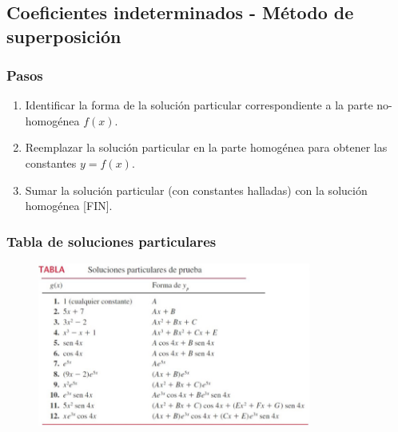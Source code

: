 \chapter{}
\section{Coeficientes indeterminados - Método de superposición}

\subsection{Pasos}

\begin{enumerate}
\item Identificar la forma de la solución particular correspondiente a la parte no-homogénea $f(x)$.

\item Reemplazar la solución particular en la parte homogénea para obtener las constantes $y = f(x)$.

\item Sumar la solución particular (con constantes halladas) con la solución homogénea [FIN].
\end{enumerate}


\subsection{Tabla de soluciones particulares}

\begin{figure}[h]
    \centering
    \includegraphics[width=0.8\textwidth]{tabla.png}
\end{figure}

